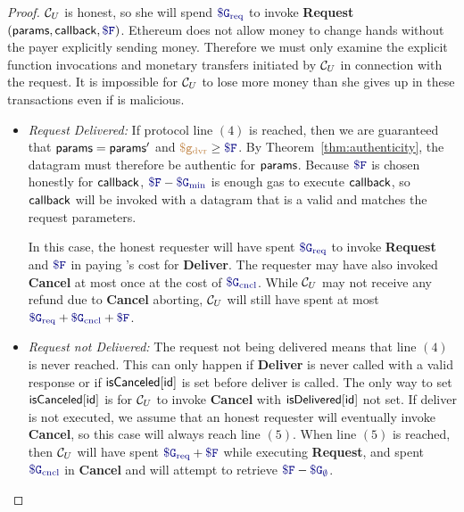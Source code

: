 \begin{proof}
${\cal C}_U$ is honest, so she will spend $\constgasrequest$ to invoke {\bf Request}$(\dgform, \dgcallback, \consthonestfee)$.
Ethereum does not allow money to change hands without the payer explicitly sending money.
Therefore we must only examine the explicit function invocations and monetary transfers initiated by ${\cal C}_U$ in connection with the request.
It is impossible for ${\cal C}_U$ to lose more money than she gives up in these transactions even if \tc is malicious.

\begin{itemize}
\item {\it Request Delivered:}
If protocol line $(4)$ is reached, then we are guaranteed that ${\sf params} = {\sf params}'$ and $\gasdeliver \geq \consthonestfee$.
By Theorem~\ref{thm:authenticity}, the datagram must therefore be authentic for ${\sf params}$.
Because $\consthonestfee$ is chosen honestly for ${\sf callback}$, $\consthonestfee - \constgasmin$ is enough gas to execute ${\sf callback}$,
so ${\sf callback}$ will be invoked with a datagram that is a valid and matches the request parameters.

In this case, the honest requester will have spent $\constgasrequest$ to invoke {\bf Request} and $\consthonestfee$ in paying \tc's cost for {\bf Deliver}.
The requester may have also invoked {\bf Cancel} at most once at the cost of $\constgasinvokecancel$.
While ${\cal C}_U$ may not receive any refund due to {\bf Cancel} aborting, ${\cal C}_U$ will still have spent at most $\constgasrequest + \constgasinvokecancel + \consthonestfee$.


\item {\it Request not Delivered:}
The request not being delivered means that line $(4)$ is never reached.
This can only happen if {\bf Deliver} is never called with a valid response or if ${\sf isCanceled}[{\sf id}]$ is set before deliver is called.
The only way to set ${\sf isCanceled}[{\sf id}]$ is for ${\cal C}_U$ to invoke {\bf Cancel} with ${\sf isDelivered}[{\sf id}]$ not set.
If deliver is not executed, we assume that an honest requester will eventually invoke {\bf Cancel}, so this case will always reach line $(5)$.
When line $(5)$ is reached, then ${\cal C}_U$ will have spent $\constgasrequest + \consthonestfee$ while executing {\bf Request},
and spent $\constgasinvokecancel$ in {\bf Cancel} and will attempt to retrieve $\consthonestfee - \constgascancel$.


\end{itemize}
\end{proof}

